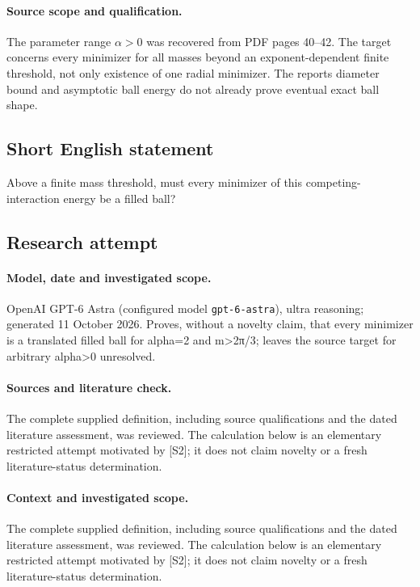 \documentclass[11pt]{article}
\begin{document}
\paragraph{Source scope and qualification.}
The parameter range $\alpha>0$ was recovered from PDF pages 40--42. The target concerns every minimizer for all masses beyond an exponent-dependent finite threshold, not only existence of one radial minimizer. The report\textquotesingle s diameter bound and asymptotic ball energy do not already prove eventual exact ball shape.
\subsection{Short English statement}
Above a finite mass threshold, must every minimizer of this competing-interaction energy be a filled ball?
\subsection{Research attempt}
\paragraph{Model, date and investigated scope.}
OpenAI GPT-6 Astra (configured model \texttt{gpt-6-astra}), ultra reasoning; generated 11 October 2026. Proves, without a novelty claim, that every minimizer is a translated filled ball for alpha=2 and m>2π/3; leaves the source target for arbitrary alpha>0 unresolved.

\paragraph{Sources and literature check.}
The complete supplied definition, including source qualifications and the dated literature assessment, was reviewed. The calculation below is an elementary restricted attempt motivated by [S2]; it does not claim novelty or a fresh literature-status determination.

\paragraph{Context and investigated scope.} The complete supplied definition, including source qualifications and the dated literature assessment, was reviewed. The calculation below is an elementary restricted attempt motivated by [S2]; it does not claim novelty or a fresh literature-status determination.
\end{document}
